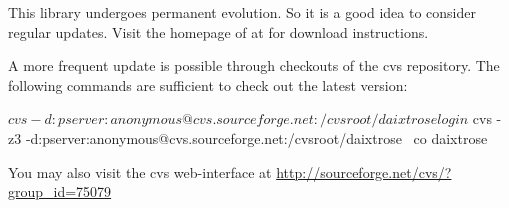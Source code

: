 This library undergoes permanent evolution. So it is a good idea to consider regular
updates. Visit the homepage of \Daixtrose at 
for download instructions. 

A more frequent update is possible through checkouts of the cvs repository.  The
following commands are sufficient to check out the latest version:

\begin{code}
  $ cvs -d:pserver:anonymous@cvs.sourceforge.net:/cvsroot/daixtrose login 
  $ cvs -z3 -d:pserver:anonymous@cvs.sourceforge.net:/cvsroot/daixtrose \
    co daixtrose 
\end{code}


You may also visit the cvs web-interface at
\url{http://sourceforge.net/cvs/?group_id=75079}





